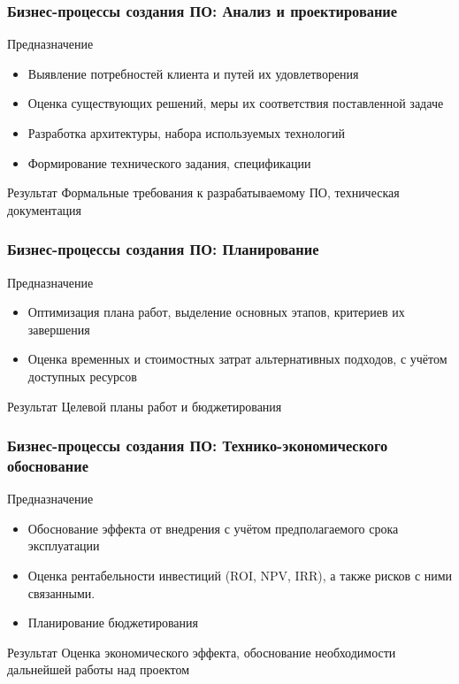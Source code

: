 \documentclass{../industrial-development}
\begin{document}
\begin{frame} \frametitle{Бизнес-процессы создания ПО: Анализ и проектирование}
	\begin{block}{Предназначение}
		\begin{itemize}
			\item Выявление потребностей клиента и путей их удовлетворения
			\item Оценка существующих решений, меры их соответствия поставленной задаче
			\item Разработка архитектуры, набора используемых технологий
			\item Формирование технического задания, спецификации
		\end{itemize}
	\end{block}
	\begin{block}{Результат}
		Формальные требования к разрабатываемому ПО, техническая документация
	\end{block}
\end{frame}
\lecturenotes


\begin{frame} \frametitle{Бизнес-процессы создания ПО: Планирование}
	\begin{block}{Предназначение}
		\begin{itemize}
			\item Оптимизация плана работ, выделение основных этапов, критериев их завершения
			\item Оценка временных и стоимостных затрат альтернативных подходов, с учётом доступных ресурсов
		\end{itemize}
	\end{block}
	\begin{block}{Результат}
		Целевой планы работ и бюджетирования
	\end{block}
\end{frame}
\lecturenotes


\begin{frame} \frametitle{Бизнес-процессы создания ПО: Технико-экономического обоснование}
	\begin{block}{Предназначение}
		\begin{itemize}
			\item Обоснование эффекта от внедрения с учётом предполагаемого срока эксплуатации
			\item Оценка рентабельности инвестиций (ROI, NPV, IRR), а также рисков с ними связанными.
			\item Планирование бюджетирования
		\end{itemize}
	\end{block}
	\begin{block}{Результат}
		Оценка экономического эффекта, обоснование необходимости дальнейшей работы над проектом
	\end{block}
\end{frame}
\lecturenotes
\end{document}
